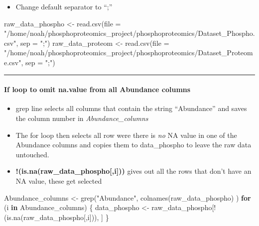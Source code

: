 \documentclass[
]{article}
\newenvironment{Shaded}{\begin{snugshade}}{\end{snugshade}}
\newcommand{\AttributeTok}[1]{\textcolor[rgb]{0.77,0.63,0.00}{#1}}
\newcommand{\ControlFlowTok}[1]{\textcolor[rgb]{0.13,0.29,0.53}{\textbf{#1}}}
\newcommand{\FunctionTok}[1]{\textcolor[rgb]{0.00,0.00,0.00}{#1}}
\newcommand{\NormalTok}[1]{#1}
\newcommand{\OtherTok}[1]{\textcolor[rgb]{0.56,0.35,0.01}{#1}}
\newcommand{\SpecialCharTok}[1]{\textcolor[rgb]{0.00,0.00,0.00}{#1}}
\newcommand{\StringTok}[1]{\textcolor[rgb]{0.31,0.60,0.02}{#1}}
\providecommand{\tightlist}{%
  \setlength{\itemsep}{0pt}\setlength{\parskip}{0pt}}
\begin{document}
\begin{itemize}
\tightlist
\item
  Change default separator to ``;''
\end{itemize}

\begin{Shaded}
\begin{Highlighting}[]
\NormalTok{raw\_data\_phospho }\OtherTok{\textless{}{-}} \FunctionTok{read.csv}\NormalTok{(}\AttributeTok{file =} \StringTok{"/home/noah/phosphoproteomics\_project/phosphoproteomics/Dataset\_Phospho.csv"}\NormalTok{, }\AttributeTok{sep =} \StringTok{";"}\NormalTok{)}
\NormalTok{raw\_data\_proteom }\OtherTok{\textless{}{-}} \FunctionTok{read.csv}\NormalTok{(}\AttributeTok{file =} \StringTok{"/home/noah/phosphoproteomics\_project/phosphoproteomics/Dataset\_Proteome.csv"}\NormalTok{, }\AttributeTok{sep =} \StringTok{";"}\NormalTok{)}
\end{Highlighting}
\end{Shaded}

\begin{center}\rule{0.5\linewidth}{0.5pt}\end{center}

\hypertarget{if-loop-to-omit-na.value-from-all-abundance-columns}{%
\paragraph{If loop to omit na.value from all Abundance
columns}\label{if-loop-to-omit-na.value-from-all-abundance-columns}}

\begin{itemize}
\tightlist
\item
  grep line selects all columns that contain the string ``Abundance''
  and saves the column number in \emph{Abundance\_columns}
\item
  The for loop then selects all row were there is \emph{no} NA value in
  one of the Abundance columns and copies them to data\_phospho to leave
  the raw data untouched.
\item
  \textbf{!(is.na(raw\_data\_phospho{[},i{]}))} gives out all the rows
  that don't have an NA value, these get selected
\end{itemize}

\begin{Shaded}
\begin{Highlighting}[]
\NormalTok{Abundance\_columns }\OtherTok{\textless{}{-}} \FunctionTok{grep}\NormalTok{(}\StringTok{"Abundance"}\NormalTok{, }\FunctionTok{colnames}\NormalTok{(raw\_data\_phospho) )}
\ControlFlowTok{for}\NormalTok{ (i }\ControlFlowTok{in}\NormalTok{ Abundance\_columns) \{}
\NormalTok{  data\_phospho }\OtherTok{\textless{}{-}}\NormalTok{ raw\_data\_phospho[}\SpecialCharTok{!}\NormalTok{(}\FunctionTok{is.na}\NormalTok{(raw\_data\_phospho[,i])), ]}
\NormalTok{  \}}
\end{Highlighting}
\end{Shaded}
\end{document}
